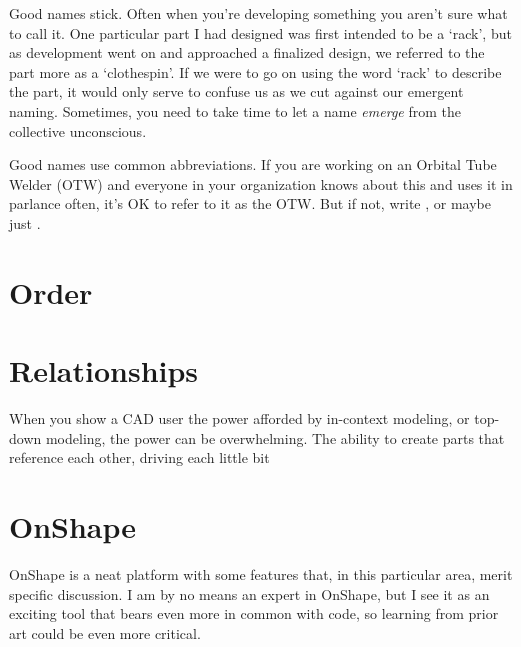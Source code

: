 Good names stick. Often when you're developing something you aren't sure what to call it. One particular part I had designed was first intended to be a `rack', but as development went on and approached a finalized design, we referred to the part more as a `clothespin'. If we were to go on using the word `rack' to describe the part, it would only serve to confuse us as we cut against our emergent naming. Sometimes, you need to take time to let a name \textit{emerge} from the collective unconscious.

Good names use common abbreviations. If you are working on an Orbital Tube Welder (OTW) and everyone in your organization knows about this and uses it in parlance often, it's OK to refer to it as the OTW. But if not, write , or maybe just .

\section{Order}

\section{Relationships}

When you show a CAD user the power afforded by in-context modeling, or top-down modeling, the power can be overwhelming. The ability to create parts that reference each other, driving each little bit

\section{OnShape}
OnShape is a neat platform with some features that, in this particular area, merit specific discussion. I am by no means an expert in OnShape, but I see it as an exciting tool that bears even more in common with code, so learning from prior art could be even more critical.